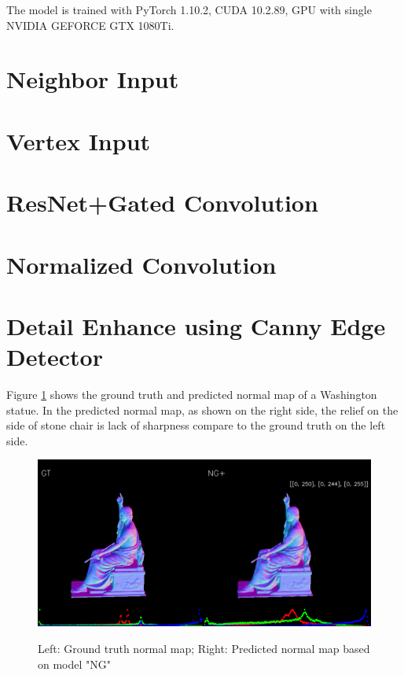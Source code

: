 The model is trained with PyTorch 1.10.2, CUDA 10.2.89, GPU with single NVIDIA GEFORCE GTX 1080Ti.


\section{Neighbor Input}


\section{Vertex Input}

\section{ResNet+Gated Convolution}


\section{Normalized Convolution}










\section{Detail Enhance using Canny Edge Detector}


Figure \ref{fig:washington_gt_ngpred} shows the ground truth and predicted normal map of a Washington statue. In the predicted normal map, as shown on the right side, the relief on the side of stone chair is lack of sharpness compare to the ground truth on the left side. 
\begin{figure}[!h]
	\centering
	{\includegraphics[width=\textwidth]{./pic/00349.gt.ngplus.png}}
	\label{fig:washington_gt_ngpred}
	\caption{Left: Ground truth normal map; Right: Predicted normal map based on model "NG"}
\end{figure}

